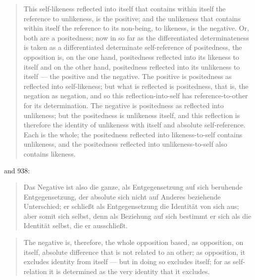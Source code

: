 \documentclass{article}
\begin{document}
\begin{quote}
    This self-likeness reflected into itself that contains within itself the reference to unlikeness,
is the positive; and the unlikeness that contains within itself the reference to its non-being, to likeness,
is the negative. Or, both are a positedness; now in so far as the differentiated determinateness is taken
as a differentiated determinate self-reference of positedness, the opposition is, on the one hand, positedness
reflected into its likeness to itself and on the other hand, positedness reflected into its unlikeness
to itself — the positive and the negative. The positive is positedness as reflected into self-likeness;
but what is reflected is positedness, that is, the negation as negation, and so this reflection-into-self
has reference-to-other for its determination. The negative is positedness as reflected into unlikeness;
but the positedness is unlikeness itself, and this reflection is therefore the identity of unlikeness
with itself and absolute self-reference. Each is the whole; the positedness reflected into likeness-to-self
contains unlikeness, and the positedness reflected into unlikeness-to-self also contains likeness.
\end{quote}

and 938:

\begin{quote}
    Das Negative ist also die ganze, als Entgegensetzung auf sich beruhende Entgegensetzung, der absolute
sich nicht auf Anderes beziehende Unterschied; er schließt als Entgegensetzung die Identität von sich
aus; aber somit sich selbst, denn als Beziehung auf sich bestimmt er sich als die Identität selbst, die
er ausschließt.
\end{quote}

\begin{quote}
    The negative is, therefore, the whole opposition based, as opposition, on itself, absolute difference
that is not related to an other; as opposition, it excludes identity from itself — but in doing so excludes
itself; for as self-relation it is determined as the very identity that it excludes.
\end{quote}
\end{document}
